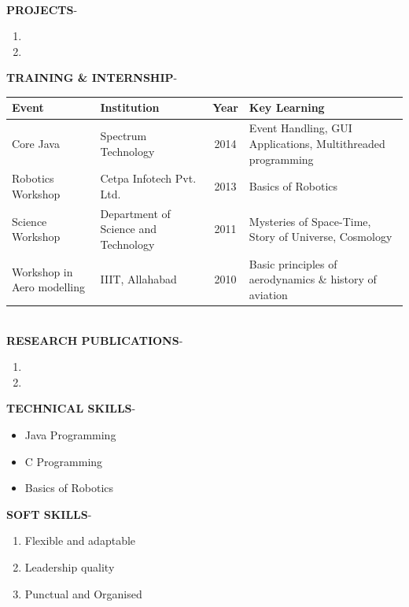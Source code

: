 \documentclass{article}
\begin{document}
	\\[\baselineskip]
	\textbf{PROJECTS}-
	\begin{enumerate}
		\item
		\item
	\end{enumerate}
	\textbf{TRAINING \& INTERNSHIP}- \\
	\begin{tabular}{|p{5cm}|p{5cm}|c|p{5cm}|}
		\hline
		\textbf{Event} & \textbf{Institution} & \textbf{Year} & \textbf{Key Learning}\\
		\hline
		Core Java & Spectrum Technology & 2014 & Event Handling, GUI Applications, Multithreaded programming \\
		\hline
		Robotics Workshop & Cetpa Infotech Pvt. Ltd. & 2013 & Basics of Robotics\\
		\hline
		Science Workshop & Department of Science and Technology & 2011 & Mysteries of Space-Time, Story of Universe, Cosmology\\
		\hline
		Workshop in Aero modelling & IIIT, Allahabad & 2010 & Basic principles of aerodynamics \& history of aviation\\
		\hline
	\end{tabular}
	\\[\baselineskip]
	\textbf{RESEARCH PUBLICATIONS}-
	\begin{enumerate}
		\item
		\item 
	\end{enumerate}
	\textbf{TECHNICAL SKILLS}-
	\begin{itemize}
		\item Java Programming
		\item C Programming
		\item Basics of Robotics \\[\baselineskip]
	\end{itemize}
\newpage
\textbf{SOFT SKILLS}-
\begin{enumerate}
	\item Flexible and adaptable
	\item Leadership quality 
	\item Punctual and Organised \\[\baselineskip]
\end{enumerate}
\end{document}
